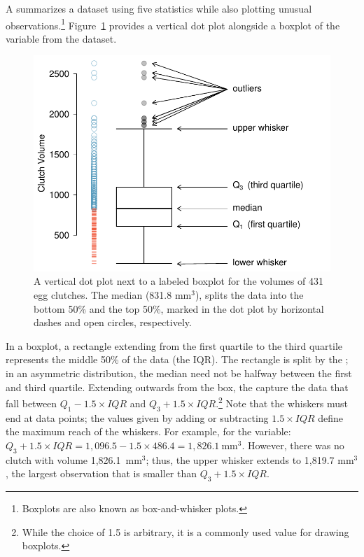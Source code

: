 A  summarizes a dataset using five statistics while also plotting unusual observations.\footnote{Boxplots are also known as box-and-whisker plots.} Figure~\ref{frogBoxPlot} provides a vertical dot plot alongside a boxplot of the  variable from the  dataset. 

\begin{figure}[th]
	\centering
	\includegraphics[width=0.86\mycaptionwidth]{ch_intro_to_data_oi_biostat/figures/frogBoxPlot/frogBoxPlot}
	\caption{A vertical dot plot next to a labeled boxplot for the volumes of 431 egg clutches. The median (831.8 $\textrm {mm}^{3}$), splits the data into the bottom 50\% and the top 50\%, marked in the dot plot by horizontal dashes and open circles, respectively.}
	\label{frogBoxPlot}
\end{figure}

In a boxplot, a rectangle extending from the first quartile to the third quartile represents the middle 50\% of the data (the IQR). The rectangle is split by the ; in an asymmetric distribution, the median need not be halfway between the first and third quartile. Extending outwards from the box, the  capture the data that fall between $Q_1 - 1.5\times IQR$ and $Q_3 + 1.5\times IQR$.\footnote{While the choice of 1.5 is arbitrary, it is a commonly used value for drawing boxplots.} Note that the whiskers must end at data points; the values given by adding or subtracting $1.5\times IQR$ define the maximum reach of the whiskers. For example, for the  variable: $Q_3 + 1.5\times IQR = 1,096.5 - 1.5\times 486.4 = 1,826.1\ \textrm {mm}^{3}$. However, there was no clutch with volume 1,826.1\ $\textrm {mm}^{3}$; thus, the upper whisker extends to 1,819.7 $\textrm {mm}^{3}$, the largest observation that is smaller than $Q_3 + 1.5\times IQR$.


